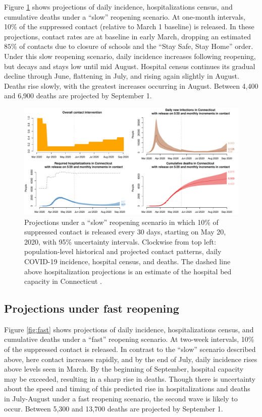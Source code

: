 \documentclass[11pt]{article}
\begin{document}
Figure \ref{fig:slow} shows projections of daily incidence, hospitalizations census, and cumulative deaths under a ``slow'' reopening scenario. At one-month intervals, 10\% of the suppressed contact (relative to March 1 baseline) is released.  In these projections, contact rates are at baseline in early March, dropping an estimated $85\%$ of contacts due to closure of schools and the ``Stay Safe, Stay Home'' order.  Under this slow reopening scenario, daily incidence increases following reopening, but decays and stays low until mid August.  Hospital census continues its gradual decline through June, flattening in July, and rising again slightly in August. Deaths rise slowly, with the greatest increases occurring in August. Between 4,400 and 6,900 deaths are projected by September 1.  


\begin{figure}
\centering
\includegraphics[width=\textwidth]{figures/slow.pdf}
\caption{Projections under a ``slow'' reopening scenario in which 10\% of suppressed contact is released every 30 days, starting on May 20, 2020, with 95\% uncertainty intervals. Clockwise from top left: population-level historical and projected contact patterns, daily COVID-19 incidence, hospital census, and deaths. The dashed line above hospitalization projections is an estimate of the hospital bed capacity in Connecticut \citep{CHAwebsite}. }

\label{fig:slow}
\end{figure}



\subsection*{Projections under fast reopening} 

Figure \ref{fig:fast} shows projections of daily incidence, hospitalizations census, and cumulative deaths under a ``fast'' reopening scenario. At two-week intervals, 10\% of the suppressed contact is released.   In contrast to the ``slow'' scenario described above, here contact increases rapidly, and by the end of July, daily incidence rises above levels seen in March.  By the beginning of September, hospital capacity may be exceeded, resulting in a sharp rise in deaths.  Though there is uncertainty about the speed and timing of this predicted rise in hospitalizations and deaths in July-August under a fast reopening scenario, the second wave is likely to occur. Between 5,300 and 13,700 deaths are projected by September 1.  
\end{document}
